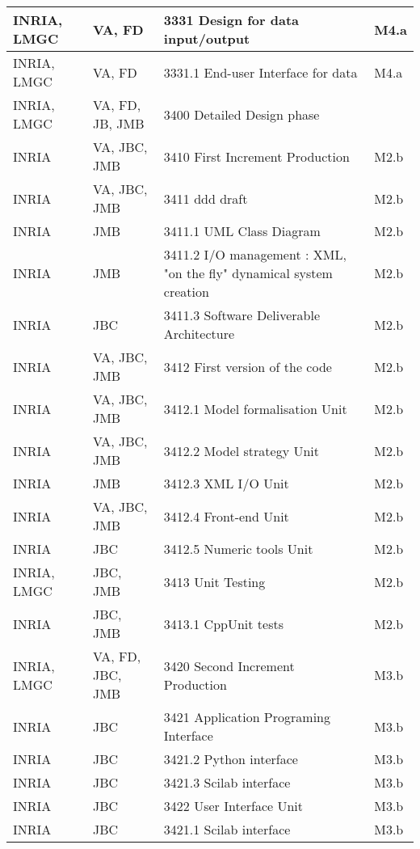 \begin{longtable}{|l|l|l|l|}
  INRIA, LMGC &  VA, FD & 3331 Design for data input/output  & M4.a \\ \hline        
  INRIA, LMGC &  VA, FD & 3331.1 End-user Interface for data  & M4.a \\ \hline
  INRIA, LMGC & VA, FD, JB, JMB &   3400 Detailed Design phase                  &  \\ \hline
  INRIA & VA, JBC, JMB &   3410 First Increment Production                      & M2.b \\ \hline
  INRIA & VA, JBC, JMB &   3411 \ac{ddd} draft          & M2.b \\ \hline
  INRIA & JMB &   3411.1 UML Class Diagram                      & M2.b \\ \hline
  INRIA & JMB &   3411.2 I/O management : XML, "on the fly" dynamical system creation & M2.b \\ \hline
  INRIA & JBC &   3411.3 Software Deliverable Architecture  & M2.b \\ \hline
  INRIA & VA, JBC, JMB &   3412 First version of the code       & M2.b \\ \hline
  INRIA & VA, JBC, JMB &   3412.1 Model formalisation Unit      & M2.b \\ \hline
  INRIA & VA, JBC, JMB &   3412.2 Model strategy Unit   & M2.b \\ \hline
  INRIA & JMB &   3412.3 XML I/O Unit                                   & M2.b \\ \hline
  INRIA & VA, JBC, JMB &   3412.4 Front-end Unit                & M2.b \\ \hline
  INRIA & JBC &   3412.5 Numeric tools Unit                     & M2.b \\ \hline
  INRIA, LMGC & JBC, JMB &   3413 Unit Testing                  & M2.b \\ \hline
  INRIA & JBC, JMB &   3413.1 CppUnit tests                     & M2.b \\ \hline
  INRIA, LMGC & VA, FD, JBC, JMB &   3420 Second Increment Production  & M3.b \\ \hline
  INRIA & JBC &   3421 Application Programing Interface  & M3.b \\ \hline
  INRIA & JBC &   3421.2 Python interface                       & M3.b \\ \hline
  INRIA & JBC &   3421.3 Scilab interface                               & M3.b \\ \hline
  INRIA & JBC &   3422 User Interface Unit              & M3.b \\ \hline
  INRIA & JBC &   3421.1 Scilab interface               & M3.b \\ \hline

\end{longtable}

